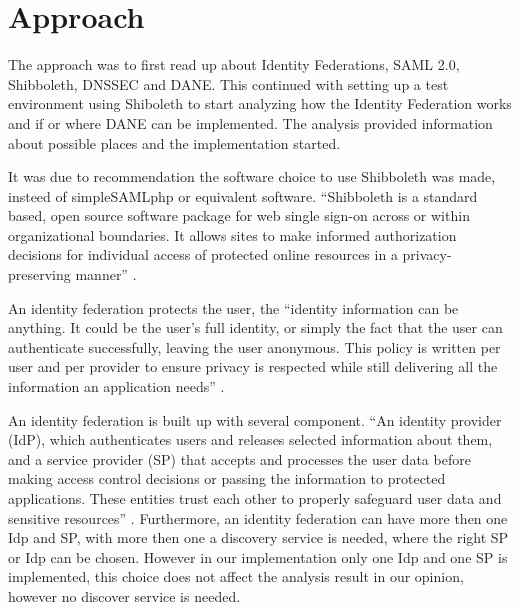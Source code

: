 \section{Approach}

The approach was to first read up about Identity Federations, SAML 2.0, Shibboleth, DNSSEC and DANE. 
This continued with setting up a test environment using Shiboleth to start analyzing how the Identity Federation works and if or where DANE can be implemented. 
The analysis provided information about possible places and the implementation started.  

It was due to recommendation the software choice to use Shibboleth was made, insteed of simpleSAMLphp or equivalent software. 
“Shibboleth is a standard based, open source software package for web single sign-on across or within organizational boundaries. 
It allows sites to make informed authorization decisions for individual access of protected online resources in a privacy-preserving manner” \cite{website:Shibboleth}.

An identity federation protects the user, the “identity information can be anything. 
It could be the user's full identity, or simply the fact that the user can authenticate successfully, leaving the user anonymous. 
This policy is written per user and per provider to ensure privacy is respected while still delivering all the information an application needs” \cite{website:ShibbolethHighLevelIntro}.

An identity federation is built up with several component. “An identity provider (IdP), which authenticates users and releases selected information about them, and a service provider (SP) that accepts and processes the user data before making access control decisions or passing the information to protected applications. 
These entities trust each other to properly safeguard user data and sensitive resources” \cite{website:Shibboleth}. 
Furthermore,  an identity federation can have more then one Idp and SP, with more then one a discovery service is needed, where the right SP or Idp can be chosen. However in our implementation only one Idp and one SP is implemented, this choice does not affect the analysis result in our opinion, however no discover service is needed. 




